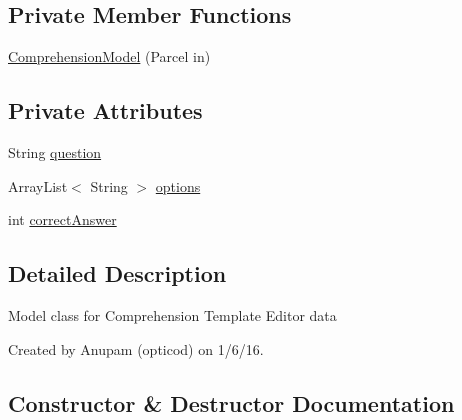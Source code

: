 \subsection*{Private Member Functions}
\begin{DoxyCompactItemize}
\item 
\hyperlink{classorg_1_1buildmlearn_1_1comprehension_1_1data_1_1ComprehensionModel_a7a11a58032f82b046f5f30cf58ebd7da}{Comprehension\+Model} (Parcel in)
\end{DoxyCompactItemize}
\subsection*{Private Attributes}
\begin{DoxyCompactItemize}
\item 
String \hyperlink{classorg_1_1buildmlearn_1_1comprehension_1_1data_1_1ComprehensionModel_a1ee55ec99912483b4905b501a1660938}{question}
\item 
Array\+List$<$ String $>$ \hyperlink{classorg_1_1buildmlearn_1_1comprehension_1_1data_1_1ComprehensionModel_a553764471ee458e9f5b8808fc24382c3}{options}
\item 
int \hyperlink{classorg_1_1buildmlearn_1_1comprehension_1_1data_1_1ComprehensionModel_ab07a660cb3b99ce9c8f9d8344dd6d008}{correct\+Answer}
\end{DoxyCompactItemize}


\subsection{Detailed Description}
Model class for Comprehension Template Editor data 

Created by Anupam (opticod) on 1/6/16. 

\subsection{Constructor \& Destructor Documentation}
